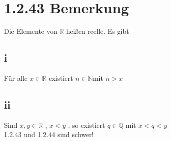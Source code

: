 \documentclass[11pt]{scrartcl}
\begin{document}
\section{1.2.43 Bemerkung}
Die Elemente von $\mathbb{R}$ heißen reelle. Es gibt \\
\subsection{i}
Für alle $x \in \mathbb{R}$ existiert $n \in \mathbb{N}$mit $n > x $ 
\subsection{ii}
Sind $x,y \in \mathbb{R}$ , $x < y$ , so existiert $q \in \mathbb{Q}$ mit $x < q < y$ \\
1.2.43 und 1.2.44 sind schwer!
\end{document}
